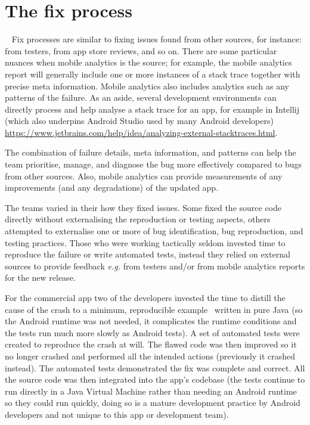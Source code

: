 \section{The fix process}~\label{aiu-the-fix-process-section}
Fix processes are similar to fixing issues found from other sources, for instance: from testers, from app store reviews, and so on. There are some particular nuances when mobile analytics is the source; for example, the mobile analytics report will generally include one or more instances of a stack trace together with precise meta information. Mobile analytics also includes analytics such as any patterns of the failure. As an aside, several development environments can directly process and help analyse a stack trace for an app, for example in Intellij (which also underpins Android Studio used by many Android developers) \url{https://www.jetbrains.com/help/idea/analyzing-external-stacktraces.html}. 

The combination of failure details, meta information, and patterns can help the team prioritise, manage, and diagnose the bug more effectively compared to bugs from other sources. Also, mobile analytics can provide measurements of any improvements (and any degradations) of the updated app.

The teams varied in their how they fixed issues. Some fixed the source code directly without externalising the reproduction or testing aspects, others attempted to externalise one or more of bug identification, bug reproduction, and testing practices. Those who were working tactically seldom invested time to reproduce the failure or write automated tests, instead they relied on external sources to provide feedback \emph{e.g.} from testers and/or from mobile analytics reports for the new release.  

For the commercial app two of the developers invested the time to distill the cause of the crash to a minimum, reproducible example~\citep{stackoverflow2022_minimal_reproducible_example} written in pure Java (so the Android runtime was not needed, it complicates the runtime conditions and the tests run much more slowly as Android tests). A set of automated tests were created to reproduce the crash at will. The flawed code was then improved so it no longer crashed and performed all the intended actions (previously it crashed instead). The automated tests demonstrated the fix was complete and correct. All the source code was then integrated into the app's codebase (the tests continue to run directly in a Java Virtual Machine rather than needing an Android runtime so they could run quickly, doing so is a mature development practice by Android developers and not unique to this app or development team).


